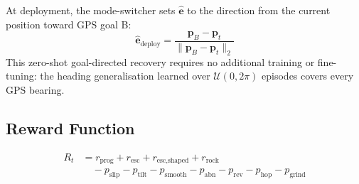 \documentclass[conference]{IEEEtran}
\begin{document}
At deployment, the mode-switcher sets $\hat{\mathbf{e}}$ to the direction from the
current position toward GPS goal B:
\begin{equation}
  \hat{\mathbf{e}}_\text{deploy} =
  \frac{\mathbf{p}_B - \mathbf{p}_t}{\|\mathbf{p}_B - \mathbf{p}_t\|_2}
\end{equation}
This zero-shot goal-directed recovery requires no additional training or
fine-tuning: the heading generalisation learned over $\mathcal{U}(0,2\pi)$
episodes covers every GPS bearing.

\subsection{Reward Function}
\label{sec:reward}

\begin{equation}
  \begin{aligned}
  R_t &= r_{\text{prog}} + r_{\text{esc}} + r_{\text{esc,shaped}}
        + r_{\text{rock}} \\
      &\quad - p_{\text{slip}} - p_{\text{tilt}}
        - p_{\text{smooth}} - p_{\text{abn}}
        - p_{\text{rev}} - p_{\text{hop}} - p_{\text{grind}}
  \end{aligned}
  \label{eq:reward}
\end{equation}
\end{document}

